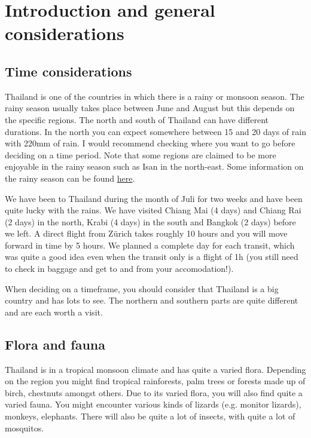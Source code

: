 \documentclass[11pt,a4paper,sans,english]{article}
\begin{document}
\section{Introduction and general considerations}
\subsection{Time considerations}
Thailand is one of the countries in which there is a rainy or monsoon season. 
The rainy season usually takes place between June and August but this depends on the specific regions. The north and south of Thailand can have different durations. In the north you can expect somewhere between 15 and 20 days of rain with 220mm of rain.
I would recommend checking where you want to go before deciding on a time period.
Note that some regions are claimed to be more enjoyable in the rainy season such as Isan in the north-east.
Some information on the rainy season can be found \href{https://thaiest.com/thailand/weather/rainy-season#:~:text=The\%20months\%20of\%20June\%20to,the\%20water\%20during\%20this\%20time.}{here}.

We have been to Thailand during the month of Juli for two weeks and have been quite lucky with the rains. We have visited Chiang Mai (4 days) and Chiang Rai (2 days) in the north, Krabi (4 days) in the south and Bangkok (2 days) before we left.
A direct flight from Zürich takes roughly 10 hours and you will move forward in time by 5 hours.
We planned a complete day for each transit, which was quite a good idea even when the transit only is a flight of 1h (you still need to check in baggage and get to and from your accomodation!).

When deciding on a timeframe, you should consider that Thailand is a big country and has lots to see. The northern and southern parts are quite different and are each worth a visit.
\subsection{Flora and fauna}
Thailand is in a tropical monsoon climate and has quite a varied flora. Depending on the region you might find tropical rainforests, palm trees or forests made up of birch, chestnuts amongst others.
Due to its varied flora, you will also find quite a varied fauna. You might encounter various kinds of lizards (e.g. monitor lizards), monkeys, elephants. There will also be quite a lot of insects, with quite a lot of mosquitos.
\end{document}
